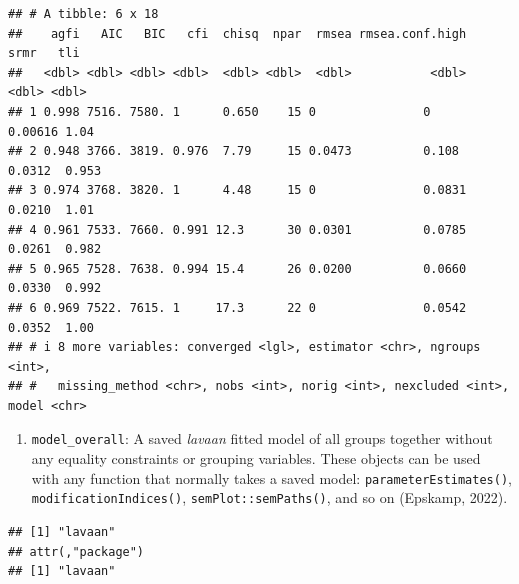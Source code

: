 \documentclass[
  man]{apa7}
\newenvironment{Shaded}{\begin{snugshade}}{\end{snugshade}}
\newcommand{\FunctionTok}[1]{\textcolor[rgb]{0.13,0.29,0.53}{\textbf{#1}}}
\newcommand{\NormalTok}[1]{#1}
\newcommand{\SpecialCharTok}[1]{\textcolor[rgb]{0.81,0.36,0.00}{\textbf{#1}}}
\providecommand{\tightlist}{%
  \setlength{\itemsep}{0pt}\setlength{\parskip}{0pt}}
\begin{document}
\small

\begin{Shaded}
\end{Shaded}

\normalsize

\begin{verbatim}
## # A tibble: 6 x 18
##    agfi   AIC   BIC   cfi  chisq  npar  rmsea rmsea.conf.high    srmr   tli
##   <dbl> <dbl> <dbl> <dbl>  <dbl> <dbl>  <dbl>           <dbl>   <dbl> <dbl>
## 1 0.998 7516. 7580. 1      0.650    15 0               0      0.00616 1.04 
## 2 0.948 3766. 3819. 0.976  7.79     15 0.0473          0.108  0.0312  0.953
## 3 0.974 3768. 3820. 1      4.48     15 0               0.0831 0.0210  1.01 
## 4 0.961 7533. 7660. 0.991 12.3      30 0.0301          0.0785 0.0261  0.982
## 5 0.965 7528. 7638. 0.994 15.4      26 0.0200          0.0660 0.0330  0.992
## 6 0.969 7522. 7615. 1     17.3      22 0               0.0542 0.0352  1.00 
## # i 8 more variables: converged <lgl>, estimator <chr>, ngroups <int>,
## #   missing_method <chr>, nobs <int>, norig <int>, nexcluded <int>, model <chr>
\end{verbatim}

\begin{enumerate}
\def\labelenumi{\arabic{enumi})}
\setcounter{enumi}{2}
\tightlist
\item
  \texttt{model\_overall}: A saved \emph{lavaan} fitted model of all groups together without any equality constraints or grouping variables. These objects can be used with any function that normally takes a saved model: \texttt{parameterEstimates()}, \texttt{modificationIndices()}, \texttt{semPlot::semPaths()}, and so on (Epskamp, 2022).
\end{enumerate}

\small

\begin{Shaded}
\end{Shaded}

\normalsize

\begin{verbatim}
## [1] "lavaan"
## attr(,"package")
## [1] "lavaan"
\end{verbatim}
\end{document}
